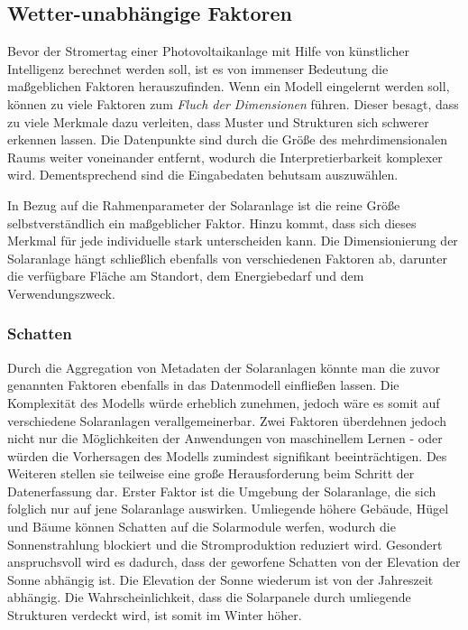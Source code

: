 \documentclass[12pt, a4paper]{article}
\begin{document}

\subsection{Wetter-unabhängige Faktoren}

Bevor der Stromertag einer Photovoltaikanlage mit Hilfe von künstlicher Intelligenz berechnet werden soll, ist es von immenser Bedeutung die maßgeblichen Faktoren herauszufinden. Wenn ein Modell eingelernt werden soll, können zu viele Faktoren zum \textit{Fluch der Dimensionen} führen. Dieser besagt, dass zu viele Merkmale dazu verleiten, dass Muster und Strukturen sich schwerer erkennen lassen. Die Datenpunkte sind durch die Größe des mehrdimensionalen Raums weiter voneinander entfernt, wodurch die Interpretierbarkeit komplexer wird. Dementsprechend sind die Eingabedaten behutsam auszuwählen.

In Bezug auf die Rahmenparameter der Solaranlage ist die reine Größe selbstverständlich ein maßgeblicher Faktor. Hinzu kommt, dass sich dieses Merkmal für jede individuelle stark unterscheiden kann. Die Dimensionierung der Solaranlage hängt schließlich ebenfalls von verschiedenen Faktoren ab, darunter die verfügbare Fläche am Standort, dem Energiebedarf und dem Verwendungszweck.

\subsubsection{Schatten}

Durch die Aggregation von Metadaten der Solaranlagen könnte man die zuvor genannten Faktoren ebenfalls in das Datenmodell einfließen lassen. Die Komplexität des Modells würde erheblich zunehmen, jedoch wäre es somit auf verschiedene Solaranlagen verallgemeinerbar. Zwei Faktoren überdehnen jedoch nicht nur die Möglichkeiten der Anwendungen von maschinellem Lernen - oder würden die Vorhersagen des Modells zumindest signifikant beeinträchtigen. Des Weiteren stellen sie teilweise eine große Herausforderung beim Schritt der Datenerfassung dar. Erster Faktor ist die Umgebung der Solaranlage, die sich folglich nur auf jene Solaranlage auswirken. Umliegende höhere Gebäude, Hügel und Bäume können Schatten auf die Solarmodule werfen, wodurch die Sonnenstrahlung blockiert und die Stromproduktion reduziert wird. Gesondert anspruchsvoll wird es dadurch, dass der geworfene Schatten von der Elevation der Sonne abhängig ist. Die Elevation der Sonne wiederum ist von der Jahreszeit abhängig. Die Wahrscheinlichkeit, dass die Solarpanele durch umliegende Strukturen verdeckt wird, ist somit im Winter höher. 
\end{document}
